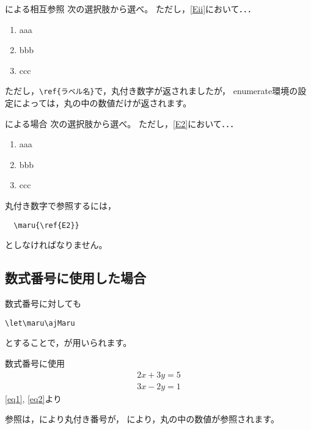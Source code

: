 \documentclass[a4j]{jarticle}
\begin{document}
\begin{showEx}{による相互参照}
\let\maru\ajMaru
次の選択肢から選べ。
ただし，\ref{Eii}において．．．
\begin{enumerate}[m]
  \item aaa
  \item \label{Eii}bbb
  \item ccc
\end{enumerate}
\end{showEx}

ただし，\verb+\ref{ラベル名}+で，丸付き数字が返されましたが，
\textsf{enumerate}環境の設定によっては，丸の中の数値だけが返されます。

\begin{showEx}{による場合}
\let\maru\ajMaru
次の選択肢から選べ。
ただし，\ref{E2}において．．．
\def\labelenumi{\maru{\theenumi}}
\begin{enumerate}
  \item aaa
  \item \label{E2}bbb
  \item ccc
\end{enumerate}
\end{showEx}

丸付き数字で参照するには，
\begin{jquote}
\begin{verbatim}
  \maru{\ref{E2}}
\end{verbatim}
\end{jquote}
としなければなりません。
\newpage

\subsection{数式番号に使用した場合}
数式番号に対しても
\begin{jquote}
\begin{verbatim}
\let\maru\ajMaru
\end{verbatim}
\end{jquote}
とすることで，が用いられます。

\begin{showEx}{数式番号に使用}
\let\maru\ajMaru
\begin{gather}
  2x+3y=5 \label{eq1} \\
  3x-2y=1 \label{eq2}
\end{gather}
\eqref{eq1}, \eqref{eq2}より
\end{showEx}

参照は，により丸付き番号が，
により，丸の中の数値が参照されます。
\end{document}
